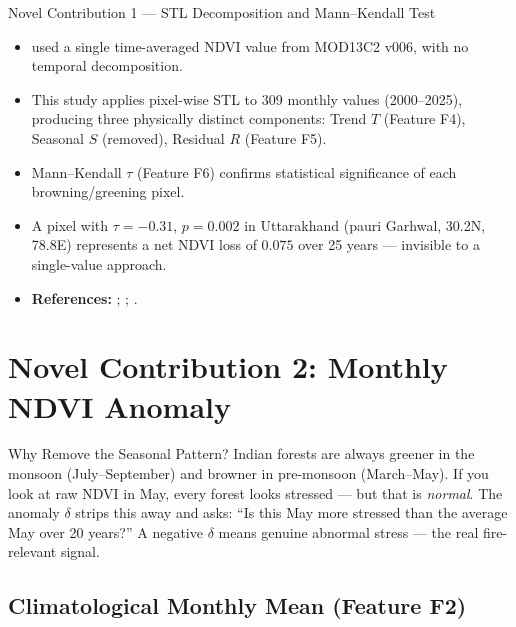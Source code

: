 \documentclass[12pt, a4paper]{article}
\begin{document}
\begin{novelbox}{Novel Contribution 1 --- STL Decomposition and Mann--Kendall Test}
\begin{itemize}[leftmargin=1.5em,itemsep=2pt]
  \item \citet{biswas2025} used a single time-averaged NDVI value
        from MOD13C2 v006, with no temporal decomposition.
  \item This study applies pixel-wise STL to 309 monthly values
        (2000--2025), producing three physically distinct components:
        Trend $T$ (Feature F4), Seasonal $S$ (removed), Residual $R$
        (Feature F5).
  \item Mann--Kendall $\tau$ (Feature F6) confirms statistical
        significance of each browning/greening pixel.
  \item A pixel with $\tau = -0.31$, $p = 0.002$ in Uttarakhand
        (pauri Garhwal, 30.2\textdegree N, 78.8\textdegree E)
        represents a net NDVI loss of $0.075$ over 25 years ---
        invisible to a single-value approach.
  \item \textbf{References:} \citet{cleveland1990stl};
        \citet{mann1945}; \citet{kendall1975}.
\end{itemize}
\end{novelbox}

\section{Novel Contribution 2: Monthly NDVI Anomaly}
\label{sec:anomaly}

\begin{simplebox}{Why Remove the Seasonal Pattern?}
Indian forests are always greener in the monsoon (July--September)
and browner in pre-monsoon (March--May). If you look at raw NDVI in
May, every forest looks stressed --- but that is \emph{normal}.
The anomaly $\delta$ strips this away and asks:
``Is this May more stressed than the average May over 20 years?''
A negative $\delta$ means genuine abnormal stress --- the real
fire-relevant signal.
\end{simplebox}

\subsection{Climatological Monthly Mean (Feature F2)}
\end{document}
